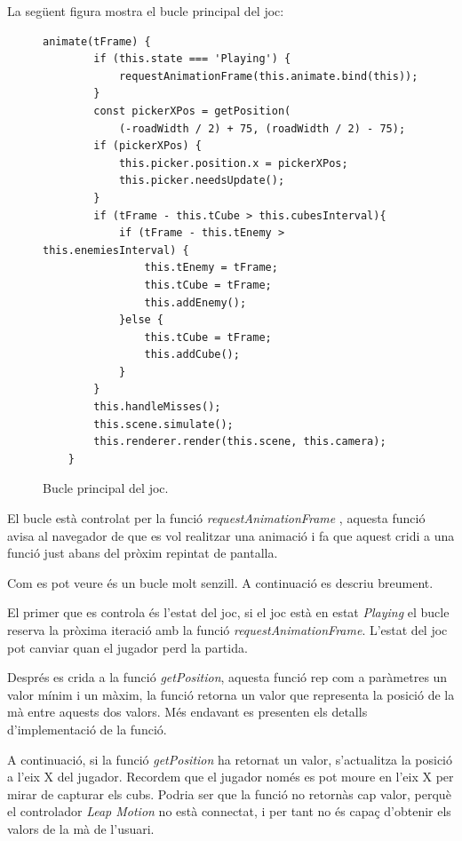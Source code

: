 \documentclass[12pt,a4paper,catalan]{article}
\begin{document}
	La següent figura mostra el bucle principal del joc:
	\begin{figure}[H]
	\begin{lstlisting}[]
	animate(tFrame) {
		if (this.state === 'Playing') {
			requestAnimationFrame(this.animate.bind(this));
		}
		const pickerXPos = getPosition(
			(-roadWidth / 2) + 75, (roadWidth / 2) - 75);
		if (pickerXPos) {
			this.picker.position.x = pickerXPos;
			this.picker.needsUpdate();
		}
		if (tFrame - this.tCube > this.cubesInterval){
			if (tFrame - this.tEnemy > this.enemiesInterval) {
				this.tEnemy = tFrame;
				this.tCube = tFrame;
				this.addEnemy();
			}else {
				this.tCube = tFrame;
				this.addCube();
			}
		}
		this.handleMisses();
		this.scene.simulate();
		this.renderer.render(this.scene, this.camera);
	}
	\end{lstlisting}
	\caption{Bucle principal del joc.}
	\label{fig:cubes-road-animate}
	\end{figure}
	El bucle està controlat per la funció \textit{requestAnimationFrame} \cite{request-animation-frame}, aquesta funció avisa al navegador de que es vol realitzar una animació i fa que aquest cridi a una funció just abans del pròxim repintat de pantalla.
	
	Com es pot veure és un bucle molt senzill. A continuació es descriu breument.
	
	El primer que es controla és l'estat del joc, si el joc està en estat \textit{Playing} el bucle reserva la pròxima iteració amb la funció \textit{requestAnimationFrame}. L'estat del joc pot canviar quan el jugador perd la partida.
	
	Després es crida a la funció \textit{getPosition}, aquesta funció rep com a paràmetres un valor mínim i un màxim, la funció retorna un valor que representa la posició de la mà entre aquests dos valors. Més endavant es presenten els detalls d'implementació de la funció.
	
	A continuació, si la funció \textit{getPosition} ha retornat un valor, s'actualitza la posició a l'eix X del jugador. Recordem que el jugador només es pot moure en l'eix X per mirar de capturar els cubs. Podria ser que la funció no retornàs cap valor, perquè el controlador \textit{Leap Motion} no està connectat, i per tant no és capaç d'obtenir els valors de la mà de l'usuari.
	
\end{document}
